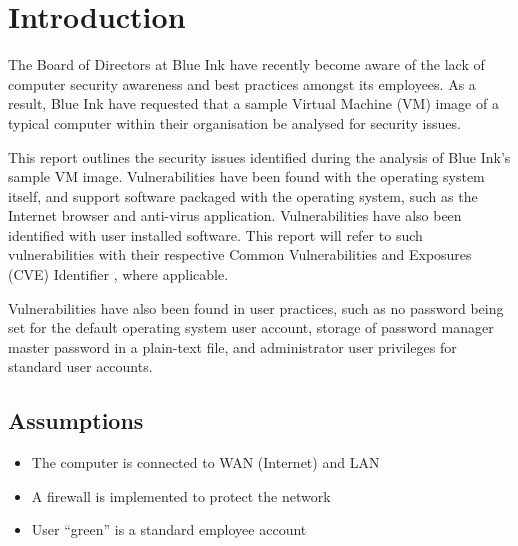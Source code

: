\section{Introduction}

The Board of Directors at Blue Ink have recently become aware of the lack of computer security awareness and best practices amongst its employees. As a result, Blue Ink have requested that a sample Virtual Machine (VM) image of a typical computer within their organisation be analysed for security issues.

This report outlines the security issues identified during the analysis of Blue Ink's sample VM image. Vulnerabilities have been found with the operating system itself, and support software packaged with the operating system, such as the Internet browser and anti-virus application. Vulnerabilities have also been identified with user installed software. This report will refer to such vulnerabilities with their respective Common Vulnerabilities and Exposures (CVE) Identifier \citep{MITRE2015}, where applicable.

Vulnerabilities have also been found in user practices, such as no password being set for the default operating system user account, storage of password manager master password in a plain-text file, and administrator user privileges for standard user accounts.


\subsection{Assumptions}

\begin{itemize}
\item The computer is connected to WAN (Internet) and LAN
\item A firewall is implemented to protect the network
\item User ``green'' is a standard employee account
\end{itemize}
